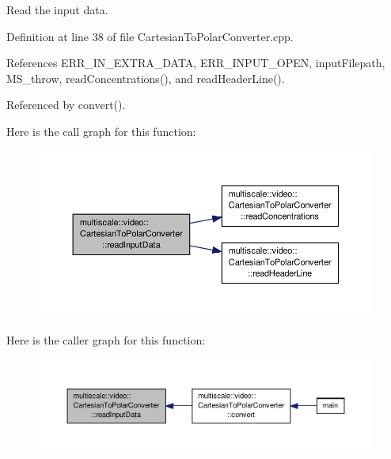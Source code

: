 Read the input data. 



Definition at line 38 of file Cartesian\-To\-Polar\-Converter.\-cpp.



References E\-R\-R\-\_\-\-I\-N\-\_\-\-E\-X\-T\-R\-A\-\_\-\-D\-A\-T\-A, E\-R\-R\-\_\-\-I\-N\-P\-U\-T\-\_\-\-O\-P\-E\-N, input\-Filepath, M\-S\-\_\-throw, read\-Concentrations(), and read\-Header\-Line().



Referenced by convert().



Here is the call graph for this function\-:
\nopagebreak
\begin{figure}[H]
\begin{center}
\leavevmode
\includegraphics[width=350pt]{classmultiscale_1_1video_1_1CartesianToPolarConverter_a37891007ade23e05047d33d0c9cb3e13_cgraph}
\end{center}
\end{figure}




Here is the caller graph for this function\-:
\nopagebreak
\begin{figure}[H]
\begin{center}
\leavevmode
\includegraphics[width=350pt]{classmultiscale_1_1video_1_1CartesianToPolarConverter_a37891007ade23e05047d33d0c9cb3e13_icgraph}
\end{center}
\end{figure}


